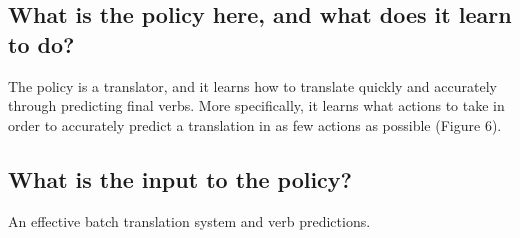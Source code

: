 \documentclass{article}
\begin{document}
\subsection{What is the policy here, and what does it learn to do?}
The policy is a translator, and it learns how to translate quickly and accurately through predicting final verbs. More specifically, it learns what actions to take in order to accurately predict a translation in as few actions as possible (Figure 6). 

\subsection{What is the input to the policy?}
An effective batch translation system and verb predictions.
\end{document}
